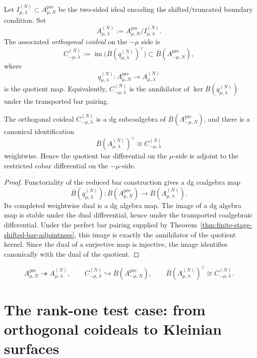 \begin{definition}
\label{def:boundary-quotient-orthogonal-coideal}
Let $I_{\mu,\lambda}^{(N)}\subset A_{\mu,N}^{\mathrm{pre}}$ be the two-sided ideal
encoding the shifted/truncated boundary condition. Set
\[
A_{\mu,\lambda}^{(N)}:=A_{\mu,N}^{\mathrm{pre}}/I_{\mu,\lambda}^{(N)}.
\]
The associated \emph{orthogonal coideal} on the $-\mu$ side is
\[
C_{-\mu,\lambda}^{(N)}
:=
\operatorname{im}\bigl(\overline{B}(q_{\mu,\lambda}^{(N)})^\vee\bigr)
\subset \overline{B}(A_{-\mu,N}^{\mathrm{pre}}),
\]
where
\[
q_{\mu,\lambda}^{(N)}\colon A_{\mu,N}^{\mathrm{pre}}\to A_{\mu,\lambda}^{(N)}
\]
is the quotient map. Equivalently, $C_{-\mu,\lambda}^{(N)}$ is the annihilator of
$\ker \overline{B}(q_{\mu,\lambda}^{(N)})$ under the transported bar pairing.
\end{definition}

\begin{theorem}
\label{thm:quotient-coideal-descent}
The orthogonal coideal $C_{-\mu,\lambda}^{(N)}$ is a dg subcoalgebra of
$\overline{B}(A_{-\mu,N}^{\mathrm{pre}})$, and there is a canonical
identification
\[
\overline{B}(A_{\mu,\lambda}^{(N)})^\vee\cong C_{-\mu,\lambda}^{(N)}
\]
weightwise. Hence the quotient bar differential on the $\mu$-side is adjoint to
the restricted cobar differential on the $-\mu$-side.
\end{theorem}

\begin{proof}
Functoriality of the reduced bar construction gives a dg coalgebra map
\[
\overline{B}(q_{\mu,\lambda}^{(N)})\colon
\overline{B}(A_{\mu,N}^{\mathrm{pre}})\to \overline{B}(A_{\mu,\lambda}^{(N)}).
\]
Its completed weightwise dual is a dg algebra map. The image of a dg algebra
map is stable under the dual differential, hence under the transported
coalgebraic differential. Under the perfect bar pairing supplied by
Theorem~\ref{thm:finite-stage-shifted-bar-adjointness}, this image is exactly the
annihilator of the quotient kernel. Since the dual of a surjective map is
injective, the image identifies canonically with the dual of the quotient.
\end{proof}

\[
A_{\mu,N}^{\mathrm{pre}}\twoheadrightarrow A_{\mu,\lambda}^{(N)},
\qquad
C_{-\mu,\lambda}^{(N)}\hookrightarrow \overline{B}(A_{-\mu,N}^{\mathrm{pre}}),
\qquad
\overline{B}(A_{\mu,\lambda}^{(N)})^\vee\cong C_{-\mu,\lambda}^{(N)}.
\]

\section{The rank-one test case: from orthogonal coideals to Kleinian surfaces}
\label{sec:rank-one-test-case}


